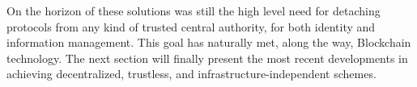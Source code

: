 On the horizon of these solutions was still the high level need for detaching \pol{} protocols from any kind of trusted central authority, for both identity and information management. This goal has naturally met, along the way, Blockchain technology. The next section will finally present the most recent developments in achieving decentralized, trustless, and infrastructure-independent \pol{} schemes.
